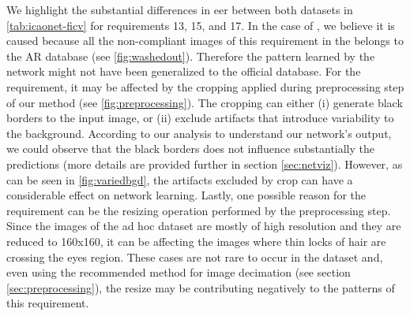 We highlight the substantial differences in \acs{eer} between both datasets in \autoref{tab:icaonet-ficv} for requirements 13, 15, and 17. In the case of \citeReq{\washedout}, we believe it is caused because all the non-compliant images of this requirement in the \ficvtest belongs to the AR database (see \autoref{fig:washedout}). Therefore the pattern learned by the network might not have been generalized to the official database. For the \citeReq{\variedbackground} requirement, it may be affected by the cropping applied during preprocessing step of our method (see \autoref{fig:preprocessing}). The cropping can either (i) generate black borders to the input image, or (ii) exclude artifacts that introduce variability to the background. According to our analysis to understand our network's output, we could observe that the black borders does not influence substantially the predictions (more details are provided further in section \ref{sec:netviz}). However, as can be seen in \autoref{fig:variedbgd}, the artifacts excluded by crop can have a considerable effect on network learning. Lastly, one possible reason for the \citeReq{\hairacrosseyes} requirement can be the resizing operation performed by the preprocessing step. Since the images of the ad hoc dataset are mostly of high resolution and they are reduced to 160x160, it can be affecting the images where thin locks of hair are crossing the eyes region. These cases are not rare to occur in the dataset and, even using the recommended method for image decimation (see section \ref{sec:preprocessing}), the resize may be contributing negatively to the patterns of this requirement. 


